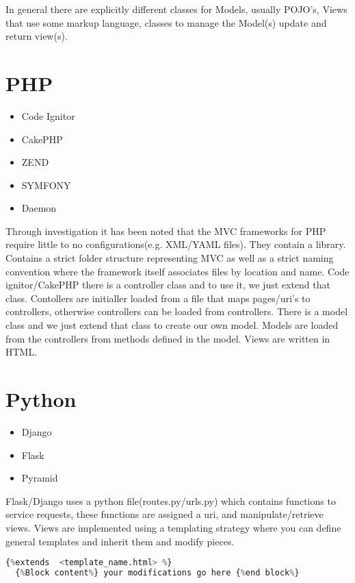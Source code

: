 In general there are explicitly different classes for Models, usually POJO's, Views that use some markup language,
classes to manage the Model(s) update and return view(s).

\section{PHP}

\begin{itemize}
  \item Code Ignitor
  \item CakePHP
  \item ZEND
  \item SYMFONY
  \item Daemon
\end{itemize}

\par Through investigation it has been noted that the MVC frameworks for PHP require little to no configurations(e.g. XML/YAML files).
They contain a library. Contains a strict folder structure representing MVC as well as a strict naming convention where the framework itself associates files by location and name.
Code ignitor/CakePHP there is a controller class and to use it, we just extend that class. Contollers are initialler loaded from a file that maps pages/uri's to controllers,
otherwise controllers can be loaded from controllers. There is a model class and we just extend that class to create our own model.
Models are loaded from the controllers from methods defined in the model. Views are written in HTML. \newpage


\section{Python}
\begin{itemize}
  \item Django
  \item Flask
  \item Pyramid
\end{itemize}

Flask/Django uses a python file(routes.py/urls.py) which contains functions to service requests, these functions are assigned a uri, and manipulate/retrieve views.
Views are implemented using a templating strategy where you can define general templates and inherit them and modify pieces.

\begin{lstlisting}[language=Python]
  {%extends  <template_name.html> %}
  {%Block content%} your modifications go here {%end block%}
\end{lstlisting}

